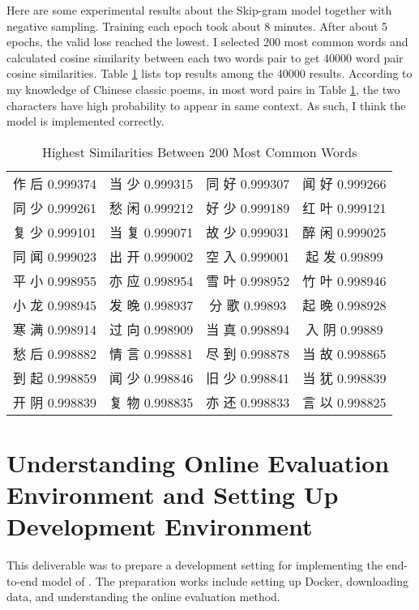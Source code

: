 \documentclass[12pt]{article}
\begin{document}
Here are some experimental results about the Skip-gram model together with negative sampling. Training each epoch took about 8 minutes. After about 5 epochs, the valid loss reached the lowest. I selected 200 most common words and calculated cosine similarity between each two words pair to get 40000 word pair cosine similarities. Table \ref{table:similarity} lists top results among the 40000 results. According to my knowledge of Chinese classic poems, in most word pairs in Table \ref{table:similarity}, the two characters have high probability to appear in same context. As such, I think the model is implemented correctly.
\begin{CJK*}{UTF8}{gbsn}
\begin{table}[h!]
\centering
\begin{tabular}{c c c c }
作 后 0.999374 &
当 少 0.999315 &
同 好 0.999307 &
闻 好 0.999266 \\
同 少 0.999261 &
愁 闲 0.999212 &
好 少 0.999189 &
红 叶 0.999121 \\
复 少 0.999101 &
当 复 0.999071 &
故 少 0.999031 &
醉 闲 0.999025 \\
同 闻 0.999023 &
出 开 0.999002 &
空 入 0.999001 &
起 发 0.99899 \\
平 小 0.998955 &
亦 应 0.998954 &
雪 叶 0.998952 &
竹 叶 0.998946 \\
小 龙 0.998945 &
发 晚 0.998937 &
分 歌 0.99893 &
起 晚 0.998928 \\
寒 满 0.998914 &
过 向 0.998909 &
当 真 0.998894 &
入 阴 0.99889 \\
愁 后 0.998882 &
情 言 0.998881 &
尽 到 0.998878 &
当 故 0.998865 \\
到 起 0.998859 &
闻 少 0.998846 &
旧 少 0.998841 &
当 犹 0.998839 \\
开 阴 0.998839 &
复 物 0.998835 &
亦 还 0.998833 &
言 以 0.998825 \\

\end{tabular}
\caption{Highest Similarities Between 200 Most Common Words}
\label{table:similarity}
\end{table}
\end{CJK*}




\section{Understanding Online Evaluation Environment and Setting Up Development Environment}\label{sec:setup}

This deliverable was to prepare a development setting for implementing the end-to-end model of \cite{wang2016machine}. The preparation works include setting up Docker, downloading data, and understanding the online evaluation method.
\end{document}
